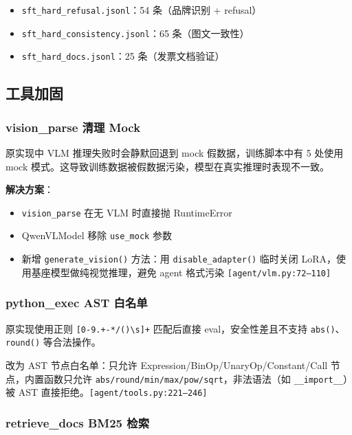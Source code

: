 \documentclass[12pt,a4paper]{ctexart}
\begin{document}
\begin{itemize}[nosep]
  \item \texttt{sft\_hard\_refusal.jsonl}：54 条（品牌识别 + refusal）
  \item \texttt{sft\_hard\_consistency.jsonl}：65 条（图文一致性）
  \item \texttt{sft\_hard\_docs.jsonl}：25 条（发票文档验证）
\end{itemize}

\subsection{工具加固}

\subsubsection{vision\_parse 清理 Mock}

原实现中 VLM 推理失败时会静默回退到 mock 假数据，训练脚本中有 5 处使用 mock 模式。这导致训练数据被假数据污染，模型在真实推理时表现不一致。

\textbf{解决方案}：
\begin{itemize}[nosep]
  \item \texttt{vision\_parse} 在无 VLM 时直接抛 RuntimeError
  \item QwenVLModel 移除 \texttt{use\_mock} 参数
  \item 新增 \texttt{generate\_vision()} 方法：用 \texttt{disable\_adapter()} 临时关闭 LoRA，使用基座模型做纯视觉推理，避免 agent 格式污染 \texttt{[agent/vlm.py:72--110]}
\end{itemize}

\subsubsection{python\_exec AST 白名单}

原实现使用正则 \texttt{[0-9.+-*/()\textbackslash s]+} 匹配后直接 eval，安全性差且不支持 \texttt{abs()}、\texttt{round()} 等合法操作。

改为 AST 节点白名单：只允许 Expression/BinOp/UnaryOp/Constant/Call 节点，内置函数只允许 \texttt{abs/round/min/max/pow/sqrt}，非法语法（如 \texttt{\_\_import\_\_}）被 AST 直接拒绝。\texttt{[agent/tools.py:221--246]}

\subsubsection{retrieve\_docs BM25 检索}
\end{document}
